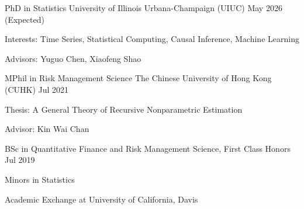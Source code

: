 

\begin{cventries}

  \cventry
    {PhD in Statistics} %
    {University of Illinois Urbana-Champaign (UIUC)} %
    {} %
    {May 2026 (Expected)} %
    {
      \begin{cvitems} %
        \item {Interests: Time Series, Statistical Computing, Causal Inference, Machine Learning}
        \item {Advisors: Yuguo Chen, Xiaofeng Shao}
      \end{cvitems}
    }

  \cventry
    {MPhil in Risk Management Science} %
    {The Chinese University of Hong Kong (CUHK)} %
    {} %
    {Jul 2021} %
    {
      \begin{cvitems} %
        \item {Thesis: A General Theory of Recursive Nonparametric Estimation}
        \item {Advisor: Kin Wai Chan}
      \end{cvitems}
    }

  \cventry
    {BSc in Quantitative Finance and Risk Management Science, First Class Honors} %
    {} %
    {} %
    {Jul 2019} %
    {
      \begin{cvitems} %
        \item {Minors in Statistics}
        \item {Academic Exchange at University of California, Davis}
      \end{cvitems}
    }

\end{cventries}
